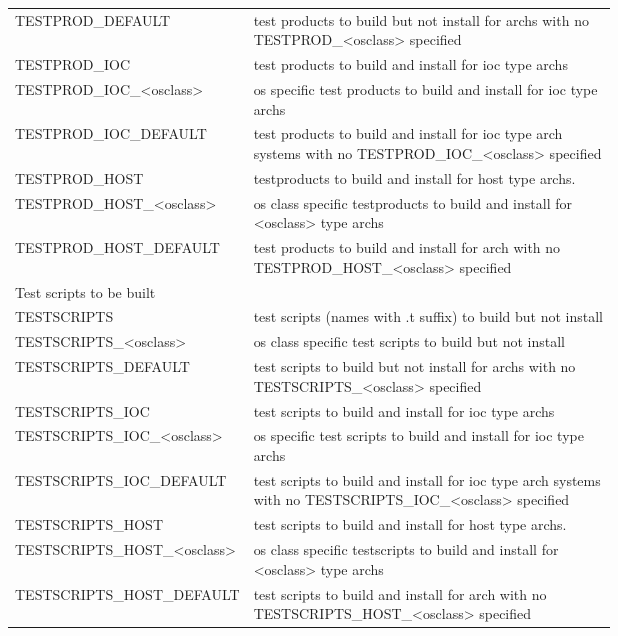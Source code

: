 \begin{center}
\begin{longtable}{lp{0.7\linewidth}}
TESTPROD\_DEFAULT & test products to build but not install for archs with no TESTPROD\_\textless{}osclass\textgreater{} specified\\
TESTPROD\_IOC & test products to build and install for ioc type archs\\
TESTPROD\_IOC\_\textless{}osclass\textgreater{} & os specific test products to build and install for ioc type archs\\
TESTPROD\_IOC\_DEFAULT & test products to build and install for ioc type arch systems with no TESTPROD\_IOC\_\textless{}osclass\textgreater{} specified\\
TESTPROD\_HOST & testproducts to build and install for host type archs. \\
TESTPROD\_HOST\_\textless{}osclass\textgreater{} & os class specific testproducts to build and install for \textless{}osclass\textgreater{} type archs\\
TESTPROD\_HOST\_DEFAULT & test products to build and install for arch with no TESTPROD\_HOST\_\textless{}osclass\textgreater{} specified\\
Test scripts to be built & \\
TESTSCRIPTS & test scripts (names with .t suffix) to build but not install\\
TESTSCRIPTS\_\textless{}osclass\textgreater{} & os class specific test scripts to build but not install\\
TESTSCRIPTS\_DEFAULT & test scripts to build but not install for archs with no TESTSCRIPTS\_\textless{}osclass\textgreater{} specified\\
TESTSCRIPTS\_IOC & test scripts to build and install for ioc type archs\\
TESTSCRIPTS\_IOC\_\textless{}osclass\textgreater{} & os specific test scripts to build and install for ioc type archs\\
TESTSCRIPTS\_IOC\_DEFAULT & test scripts to build and install for ioc type arch systems with no TESTSCRIPTS\_IOC\_\textless{}osclass\textgreater{} specified\\
TESTSCRIPTS\_HOST & test scripts to build and install for host type archs. \\
TESTSCRIPTS\_HOST\_\textless{}osclass\textgreater{} & os class specific testscripts to build and install for \textless{}osclass\textgreater{} type archs\\
TESTSCRIPTS\_HOST\_DEFAULT & test scripts to build and install for arch with no TESTSCRIPTS\_HOST\_\textless{}osclass\textgreater{} specified\\

\end{longtable}
\end{center}
